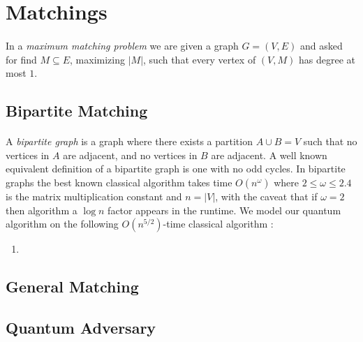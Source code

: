 \section{Matchings}
\paragraph{}
In a {\it maximum matching problem} we are given a graph $G=(V,E)$ and asked for find  $M\subseteq E$, maximizing $|M|$, such that every vertex of $(V,M)$ has degree at most $1$. \subsection{Bipartite Matching}
\paragraph{}
A {\it bipartite graph} is a graph where there exists a partition $A\cup B = V$ such that no vertices in $A$ are adjacent, and no vertices in $B$ are adjacent. A well known equivalent definition of a bipartite graph is one with no odd cycles. In bipartite graphs the best known classical algorithm takes time $O(n^\omega)$ \cite{mucha2004maximum} where $2\leq\omega\leq 2.4$ is the matrix multiplication constant and $n = |V|$, with the caveat that if $\omega = 2$ then algorithm a $\log n$ factor appears in the runtime.  We model our quantum algorithm on the following $O(n^{5/2})$-time classical algorithm \cite{hopkroft1973n5}:
\begin{enumerate}
\item
\end{enumerate}

\subsection{General Matching}

\subsection{Quantum Adversary}                                                                                                                                                                                                                                                                                                                                                                                                                                                                                                                                                                                                                                                                                                                                                                                                                                                                                                                                                                                                                                                                                                                                                                